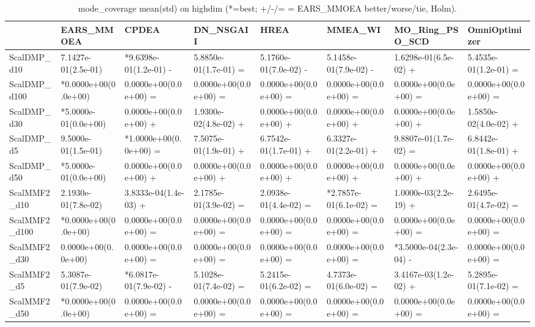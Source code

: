 \begin{table}[t]
\centering
\caption{mode_coverage mean(std) on highdim (*=best; +/-/= = EARS_MMOEA better/worse/tie, Holm).}
\label{tab:highdim_mode_coverage}
\begin{tabular}{llllllll}
\toprule
 & EARS\_MMOEA & CPDEA & DN\_NSGAII & HREA & MMEA\_WI & MO\_Ring\_PSO\_SCD & OmniOptimizer \\
\midrule
ScalDMP\_d10 & 7.1427e-01(2.5e-01) & *9.6398e-01(1.2e-01) - & 5.8850e-01(1.7e-01) = & 5.1760e-01(7.0e-02) - & 5.1458e-01(7.9e-02) - & 1.6298e-01(6.5e-02) + & 5.4535e-01(1.2e-01) = \\
ScalDMP\_d100 & *0.0000e+00(0.0e+00) & 0.0000e+00(0.0e+00) = & 0.0000e+00(0.0e+00) = & 0.0000e+00(0.0e+00) = & 0.0000e+00(0.0e+00) = & 0.0000e+00(0.0e+00) = & 0.0000e+00(0.0e+00) = \\
ScalDMP\_d30 & *5.0000e-01(0.0e+00) & 0.0000e+00(0.0e+00) + & 1.9300e-02(4.8e-02) + & 0.0000e+00(0.0e+00) + & 0.0000e+00(0.0e+00) + & 0.0000e+00(0.0e+00) + & 1.5850e-02(4.0e-02) + \\
ScalDMP\_d5 & 9.5000e-01(1.5e-01) & *1.0000e+00(0.0e+00) = & 7.5075e-01(1.9e-01) + & 6.7542e-01(1.7e-01) + & 6.3327e-01(2.2e-01) + & 9.8807e-01(1.7e-02) = & 6.8442e-01(1.8e-01) + \\
ScalDMP\_d50 & *5.0000e-01(0.0e+00) & 0.0000e+00(0.0e+00) + & 0.0000e+00(0.0e+00) + & 0.0000e+00(0.0e+00) + & 0.0000e+00(0.0e+00) + & 0.0000e+00(0.0e+00) + & 0.0000e+00(0.0e+00) + \\
ScalMMF2\_d10 & 2.1930e-01(7.8e-02) & 3.8333e-04(1.4e-03) + & 2.1785e-01(3.9e-02) = & 2.0938e-01(4.4e-02) = & *2.7857e-01(6.1e-02) = & 1.0000e-03(2.2e-19) + & 2.6495e-01(4.7e-02) = \\
ScalMMF2\_d100 & *0.0000e+00(0.0e+00) & 0.0000e+00(0.0e+00) = & 0.0000e+00(0.0e+00) = & 0.0000e+00(0.0e+00) = & 0.0000e+00(0.0e+00) = & 0.0000e+00(0.0e+00) = & 0.0000e+00(0.0e+00) = \\
ScalMMF2\_d30 & 0.0000e+00(0.0e+00) & 0.0000e+00(0.0e+00) = & 0.0000e+00(0.0e+00) = & 0.0000e+00(0.0e+00) = & 0.0000e+00(0.0e+00) = & *3.5000e-04(2.3e-04) - & 0.0000e+00(0.0e+00) = \\
ScalMMF2\_d5 & 5.3087e-01(7.9e-02) & *6.0817e-01(7.9e-02) - & 5.1028e-01(7.4e-02) = & 5.2415e-01(6.2e-02) = & 4.7373e-01(6.0e-02) = & 3.4167e-03(1.2e-02) + & 5.2895e-01(7.1e-02) = \\
ScalMMF2\_d50 & *0.0000e+00(0.0e+00) & 0.0000e+00(0.0e+00) = & 0.0000e+00(0.0e+00) = & 0.0000e+00(0.0e+00) = & 0.0000e+00(0.0e+00) = & 0.0000e+00(0.0e+00) = & 0.0000e+00(0.0e+00) = \\
\bottomrule
\end{tabular}
\end{table}
